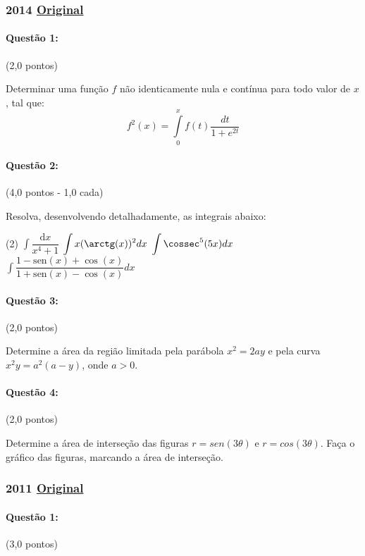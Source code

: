 \documentclass[12pt,a4paper]{article}
\newcommand{\sen}{\mathrm{sen}}
\newcommand{\dd}{\mathrm{d}}
\newcommand{\original}[1]{\tiny \href{#1}{Original} \normalsize}
\begin{document}
\newpage

\subsubsection{2014 \original{https://drive.google.com/open?id=1ayRiDMSVALdTBVXuDYoT8cCHNTlBfXAb}}

\paragraph{Questão 1:}(2,0 pontos)

Determinar uma função $f$ não identicamente nula e contínua para todo valor de $x$, tal que:
$$f^2(x)=\int\limits_0^xf(t)\dfrac{dt}{1+e^{2t}}$$

\paragraph{Questão 2:}(4,0 pontos - 1,0 cada)

Resolva, desenvolvendo detalhadamente, as integrais abaixo:

\begin{tasks}(2)
\task $\displaystyle\int \dfrac{\dd x}{x^4+1}$
\task $\displaystyle\int x( \arctg(x) )^2dx$
\task $\displaystyle\int\cossec^5(5x)dx$
\task $\displaystyle\int \dfrac{1-\sen(x)+\cos(x)}{1+\sen(x)-\cos(x)}dx$
\end{tasks}

\paragraph{Questão 3:}(2,0 pontos)

Determine a área da região limitada pela parábola $x^2=2ay$ e pela curva $x^2y=a^2(a-y)$, onde $a>0$.

\paragraph{Questão 4:}(2,0 pontos)

Determine a área de interseção das figuras $r=sen(3\theta)$ e $r=cos(3\theta)$. Faça o gráfico das figuras, marcando a área de interseção.

\newpage
\subsubsection{2011 \original{https://drive.google.com/open?id=1U9W12zCjTyu39bKnv9in6Eudj_hfruAa}}

\paragraph{Questão 1:} (3,0 pontos) 
\end{document}
